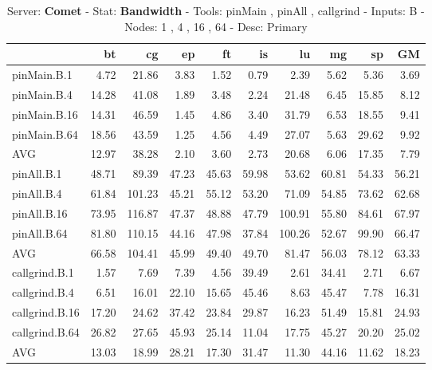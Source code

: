 \begin{table*}[]
\caption{Server: \textbf{Comet} -
 Stat: \textbf{Bandwidth} -
 Tools: pinMain , pinAll , callgrind - 
 Inputs: B -
 Nodes: 1 , 4 , 16 , 64 -
 Desc: Primary}
\label{comet_bw_pMpAcg_B_itn_p3.5}\begin{center}
\begin{tabular}{|l|rrrrrrrr|r|}
\hline
                &    bt &     cg &    ep &    ft &    is &     lu &    mg &    sp &    GM \\
\hline
 pinMain.B.1    &  4.72 &  21.86 &  3.83 &  1.52 &  0.79 &   2.39 &  5.62 &  5.36 &  3.69 \\
 pinMain.B.4    & 14.28 &  41.08 &  1.89 &  3.48 &  2.24 &  21.48 &  6.45 & 15.85 &  8.12 \\
 pinMain.B.16   & 14.31 &  46.59 &  1.45 &  4.86 &  3.40 &  31.79 &  6.53 & 18.55 &  9.41 \\
 pinMain.B.64   & 18.56 &  43.59 &  1.25 &  4.56 &  4.49 &  27.07 &  5.63 & 29.62 &  9.92 \\
 \hline
 AVG            & 12.97 &  38.28 &  2.10 &  3.60 &  2.73 &  20.68 &  6.06 & 17.35 &  7.79 \\
 \hline
 pinAll.B.1     & 48.71 &  89.39 & 47.23 & 45.63 & 59.98 &  53.62 & 60.81 & 54.33 & 56.21 \\
 pinAll.B.4     & 61.84 & 101.23 & 45.21 & 55.12 & 53.20 &  71.09 & 54.85 & 73.62 & 62.68 \\
 pinAll.B.16    & 73.95 & 116.87 & 47.37 & 48.88 & 47.79 & 100.91 & 55.80 & 84.61 & 67.97 \\
 pinAll.B.64    & 81.80 & 110.15 & 44.16 & 47.98 & 37.84 & 100.26 & 52.67 & 99.90 & 66.47 \\
 \hline
 AVG            & 66.58 & 104.41 & 45.99 & 49.40 & 49.70 &  81.47 & 56.03 & 78.12 & 63.33 \\
 \hline
 callgrind.B.1  &  1.57 &   7.69 &  7.39 &  4.56 & 39.49 &   2.61 & 34.41 &  2.71 &  6.67 \\
 callgrind.B.4  &  6.51 &  16.01 & 22.10 & 15.65 & 45.46 &   8.63 & 45.47 &  7.78 & 16.31 \\
 callgrind.B.16 & 17.20 &  24.62 & 37.42 & 23.84 & 29.87 &  16.23 & 51.49 & 15.81 & 24.93 \\
 callgrind.B.64 & 26.82 &  27.65 & 45.93 & 25.14 & 11.04 &  17.75 & 45.27 & 20.20 & 25.02 \\
 \hline
 AVG            & 13.03 &  18.99 & 28.21 & 17.30 & 31.47 &  11.30 & 44.16 & 11.62 & 18.23 \\
\hline
\end{tabular}
\end{center}
\end{table*}
